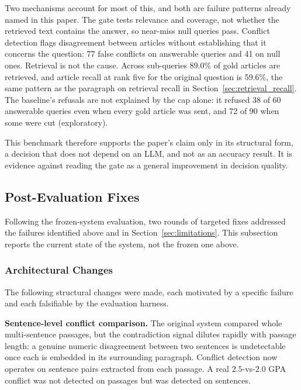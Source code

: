 \documentclass[conference]{IEEEtran}
\begin{document}
Two mechanisms account for most of this, and both are failure patterns
already named in this paper. The gate tests relevance and coverage, not
whether the retrieved text contains the answer, so near-miss null queries
pass. Conflict detection flags disagreement between articles without
establishing that it concerns the question: 77 false conflicts on answerable
queries and 41 on null ones. Retrieval is not the cause. Across sub-queries
89.0\% of gold articles are retrieved, and article recall at rank five for the
original question is 59.6\%, the same pattern as the paragraph on retrieval
recall in Section~\ref{sec:retrieval_recall}. The baseline's refusals are not
explained by the cap alone: it refused 38 of 60 answerable queries even when
every gold article was sent, and 72 of 90 when some were cut (exploratory).

This benchmark therefore supports the paper's claim only in its structural
form, a decision that does not depend on an LLM, and not as an accuracy
result. It is evidence against reading the gate as a general improvement in
decision quality.

\subsection{Post-Evaluation Fixes}
\label{sec:post_eval_fixes}

Following the frozen-system evaluation, two rounds of targeted fixes
addressed the failures identified above and in
Section~\ref{sec:limitations}. This subsection reports the current state
of the system, not the frozen one above.

\subsubsection{Architectural Changes}

The following structural changes were made, each motivated by a specific
failure and each falsifiable by the evaluation harness.

\textbf{Sentence-level conflict comparison.} The original system
compared whole multi-sentence passages, but the contradiction signal
dilutes rapidly with passage length: a genuine numeric disagreement
between two sentences is undetectable once each is embedded in its
surrounding paragraph. Conflict detection now operates on sentence
pairs extracted from each passage. A real $2.5$-vs-$2.0$ GPA conflict
was not detected on passages but was detected on sentences.
\end{document}

